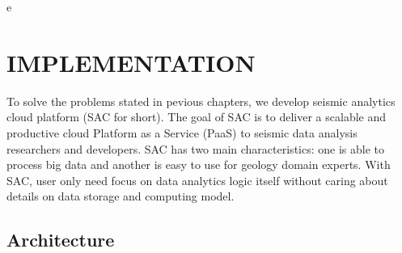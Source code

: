 e%
%
%
%

\chapter{\uppercase{Implementation}}
To solve the problems stated in pevious chapters, we develop seismic analytics cloud platform (SAC for short). The goal of SAC is to deliver a scalable and productive cloud Platform as a Service (PaaS) to seismic data analysis researchers and developers. SAC has two main characteristics: one is able to process big data and another is easy to use for geology domain experts. With SAC, user only need focus on data analytics logic itself without caring about details on data storage and computing model. 


\section{Architecture}

